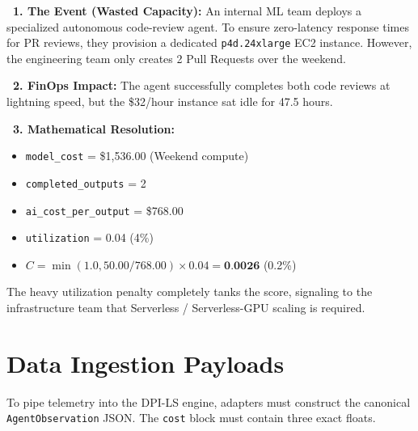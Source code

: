 \documentclass[11pt,a4paper]{article}
\begin{document}
\vspace{0.5cm}
\begin{tcolorbox}[enhanced, colback=dpicloud!5!white, colframe=dpicloud, title={\textbf{\faServer\ Scenario 2: The Over-Provisioned Idle GPU (Poor Utilization)}}, fonttitle=\bfseries, boxrule=1pt, arc=2mm, drop shadow]
\textbf{\color{dpicloud}\faHourglassHalf\ 1. The Event (Wasted Capacity):} 
An internal ML team deploys a specialized autonomous code-review agent. To ensure zero-latency response times for PR reviews, they provision a dedicated \texttt{p4d.24xlarge} EC2 instance. However, the engineering team only creates 2 Pull Requests over the weekend.

\vspace{0.2cm}
\textbf{\color{dpired}\faMoneyBillWave\ 2. FinOps Impact:} 
The agent successfully completes both code reviews at lightning speed, but the \$32/hour instance sat idle for 47.5 hours. 

\vspace{0.2cm}
\textbf{\color{dpigreen}\faCalculator\ 3. Mathematical Resolution:}
\begin{itemize}
    \item \texttt{model\_cost} = \$1,536.00 (Weekend compute)
    \item \texttt{completed\_outputs} = 2
    \item \texttt{ai\_cost\_per\_output} = \$768.00
    \item \texttt{utilization} = 0.04 (4\%)
    \item $C = \min(1.0, 50.00 / 768.00) \times 0.04 = \textbf{0.0026}$ (0.2\%)
\end{itemize}
\vspace{0.2cm}
The heavy utilization penalty completely tanks the score, signaling to the infrastructure team that Serverless / Serverless-GPU scaling is required.
\end{tcolorbox}

\newpage

\section{Data Ingestion Payloads}

To pipe telemetry into the DPI-LS engine, adapters must construct the canonical \texttt{AgentObservation} JSON. The \texttt{cost} block must contain three exact floats.
\end{document}
